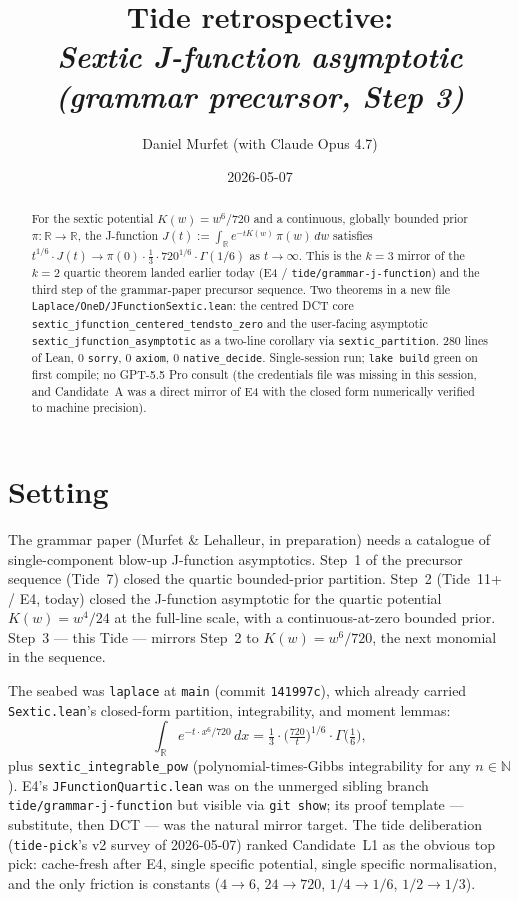 \documentclass[11pt]{article}
\title{Tide retrospective:\\\emph{Sextic J-function asymptotic\\(grammar precursor, Step 3)}}
\author{Daniel Murfet (with Claude Opus 4.7)}
\date{2026-05-07}
\begin{document}
\maketitle

\begin{abstract}
For the sextic potential $K(w) = w^6/720$ and a continuous, globally
bounded prior $\pi : \mathbb{R} \to \mathbb{R}$, the J-function
$J(t) := \int_{\mathbb R} e^{-tK(w)}\,\pi(w)\,dw$ satisfies
$t^{1/6}\cdot J(t) \to \pi(0)\cdot \tfrac13\cdot 720^{1/6}\cdot \Gamma(1/6)$
as $t\to\infty$. This is the $k=3$ mirror of the $k=2$ quartic theorem
landed earlier today (E4 / \texttt{tide/grammar-j-function}) and the
third step of the grammar-paper precursor sequence. Two theorems in a
new file \texttt{Laplace/OneD/JFunctionSextic.lean}: the centred DCT
core \texttt{sextic\_jfunction\_centered\_tendsto\_zero} and the
user-facing asymptotic \texttt{sextic\_jfunction\_asymptotic} as a
two-line corollary via \texttt{sextic\_partition}. 280 lines of
Lean, $0$ \texttt{sorry}, $0$ \texttt{axiom}, $0$ \texttt{native\_decide}.
Single-session run; \texttt{lake build} green on first compile; no
GPT-5.5 Pro consult (the credentials file was missing in this
session, and Candidate~A was a direct mirror of E4 with the closed
form numerically verified to machine precision).
\end{abstract}

\section{Setting}

The grammar paper (Murfet \& Lehalleur, in preparation) needs a
catalogue of single-component blow-up J-function asymptotics. Step~1
of the precursor sequence (Tide~7) closed the quartic bounded-prior
partition. Step~2 (Tide~11+ / E4, today) closed the J-function
asymptotic for the quartic potential $K(w) = w^4/24$ at the full-line
scale, with a continuous-at-zero bounded prior. Step~3 — this Tide —
mirrors Step~2 to $K(w) = w^6/720$, the next monomial in the
sequence.

The seabed was \texttt{laplace} at \texttt{main} (commit
\texttt{141997c}), which already carried \texttt{Sextic.lean}'s
closed-form partition, integrability, and moment lemmas:
\[
  \int_{\mathbb R} e^{-t\cdot x^6/720}\, dx
    = \tfrac13 \cdot \big(\tfrac{720}{t}\big)^{1/6} \cdot \Gamma\!\big(\tfrac16\big),
\]
plus \texttt{sextic\_integrable\_pow} (polynomial-times-Gibbs
integrability for any $n\in\mathbb N$). E4's
\texttt{JFunctionQuartic.lean} was on the unmerged sibling branch
\texttt{tide/grammar-j-function} but visible via \texttt{git show};
its proof template — substitute, then DCT — was the natural mirror
target. The tide deliberation (\texttt{tide-pick}'s v2 survey of
2026-05-07) ranked Candidate~L1 as the obvious top pick: cache-fresh
after E4, single specific potential, single specific normalisation,
and the only friction is constants ($4 \to 6$, $24 \to 720$,
$1/4\to 1/6$, $1/2\to 1/3$).
\end{document}
